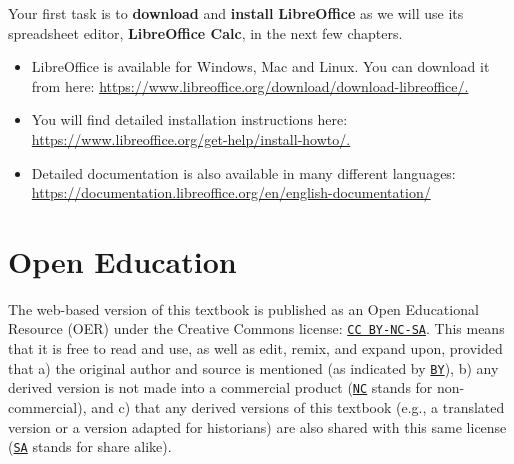 \documentclass[
  letterpaper,
  DIV=11,
  numbers=noendperiod]{scrreprt}
\begin{document}
\begin{tcolorbox}[enhanced jigsaw, rightrule=.15mm, bottomrule=.15mm, coltitle=black, breakable, toprule=.15mm, colbacktitle=quarto-callout-caution-color!10!white, titlerule=0mm, colframe=quarto-callout-caution-color-frame, colback=white, arc=.35mm, left=2mm, opacitybacktitle=0.6, opacityback=0, bottomtitle=1mm, leftrule=.75mm, title=\textcolor{quarto-callout-caution-color}{\faFire}\hspace{0.5em}{Task 1}, toptitle=1mm]

Your first task is to \textbf{download} and \textbf{install}
\textbf{LibreOffice} as we will use its spreadsheet editor,
\textbf{LibreOffice Calc}, in the next few chapters.

\begin{itemize}
\item
  LibreOffice is available for Windows, Mac and Linux. You can download
  it from here:
  \url{https://www.libreoffice.org/download/download-libreoffice/.}
\item
  You will find detailed installation instructions here:
  \href{https://www.libreoffice.org/get-help/install-howto/.You}{https://www.libreoffice.org/get-help/install-howto/.}
\item
  Detailed documentation is also available in many different languages:
  \url{https://documentation.libreoffice.org/en/english-documentation/}
\end{itemize}

\end{tcolorbox}

\section{Open Education}\label{open-education}

The web-based version of this textbook is published as an Open
Educational Resource (OER) under the Creative Commons license:
\href{https://creativecommons.org/licenses/by-nc-sa/4.0/}{\texttt{CC\ BY-NC-SA}}.
This means that it is free to read and use, as well as edit, remix, and
expand upon, provided that a) the original author and source is
mentioned (as indicated by
\href{https://creativecommons.org/licenses/by-nc-sa/4.0/}{\texttt{BY}}),
b) any derived version is not made into a commercial product
(\href{https://creativecommons.org/licenses/by-nc-sa/4.0/}{\texttt{NC}}
stands for non-commercial), and c) that any derived versions of this
textbook (e.g., a translated version or a version adapted for
historians) are also shared with this same license
(\href{https://creativecommons.org/licenses/by-nc-sa/4.0/}{\texttt{SA}}
stands for share alike).
\end{document}
